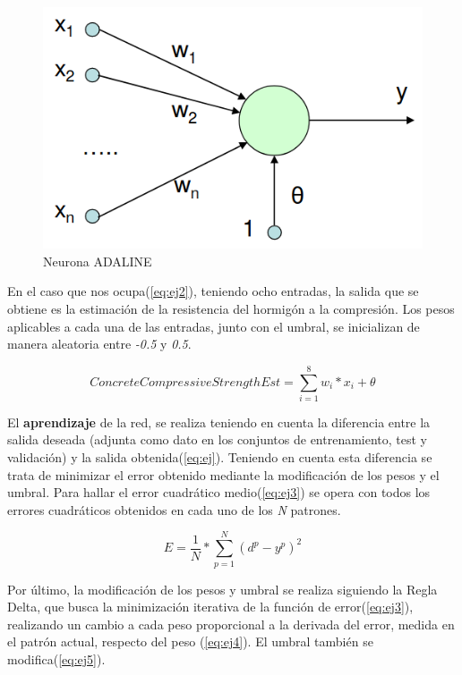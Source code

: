 \documentclass[11pt,spanish,listoffigures,listoftables]{workluis}
\begin{document}
\begin{figure}
\centering
\includegraphics[scale=0.5]{adaline}
\caption{Neurona ADALINE \cite{Adaline}}\label{fig:adaline}
\end{figure}

\par En el caso que nos ocupa(\ref{eq:ej2}), teniendo ocho entradas, la salida que se obtiene es la estimación de la resistencia del hormigón a la compresión. Los pesos aplicables a cada una de las entradas, junto con el umbral, se inicializan de manera aleatoria entre \textit{-0.5} y \textit{0.5}.

\begin{equation}\label{eq:ej2}
ConcreteCompressiveStrengthEst = \sum_{i=1}^{8}w_{i}*x_{i} + \theta
\end{equation}

\par El \textbf{aprendizaje} de la red, se realiza teniendo en cuenta la diferencia entre la salida deseada (adjunta como dato en los conjuntos de entrenamiento, test y validación) y la salida obtenida(\ref{eq:ej}). Teniendo en cuenta esta diferencia se trata de minimizar el error obtenido mediante la modificación de los pesos y el umbral. Para hallar el error cuadrático medio(\ref{eq:ej3}) se opera con todos los errores cuadráticos obtenidos en cada uno de los \textit{N} patrones. 

\begin{equation}\label{eq:ej3}
E = \frac{1}{N}* \sum_{p=1}^{N}(d^{p} - y^{p})^{2}
\end{equation}

\par Por último, la modificación de los pesos y umbral se realiza siguiendo la Regla Delta, que busca la minimización iterativa de la función de error(\ref{eq:ej3}), realizando un cambio a cada peso proporcional a la derivada del error, medida en el patrón actual, respecto del peso (\ref{eq:ej4}). El umbral también se modifica(\ref{eq:ej5}).
\end{document}
